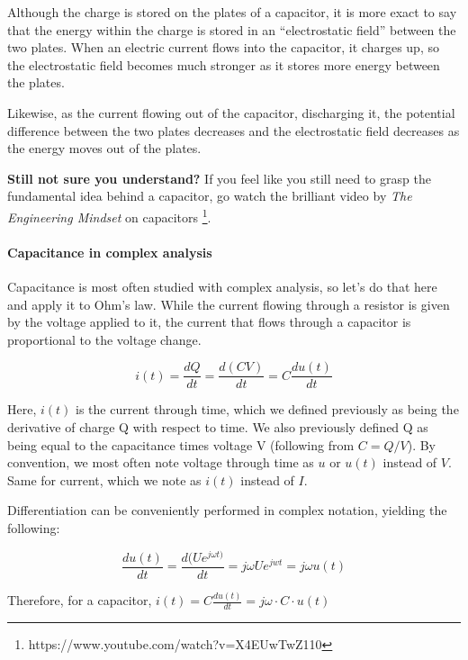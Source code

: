 Although the charge is stored on the plates of a capacitor, it is more exact to say that the energy within the charge is stored in an “electrostatic field” between the two plates. When an electric current flows into the capacitor, it charges up, so the electrostatic field becomes much stronger as it stores more energy between the plates.

Likewise, as the current flowing out of the capacitor, discharging it, the potential difference between the two plates decreases and the electrostatic field decreases as the energy moves out of the plates.

\textbf{Still not sure you understand?} If you feel like you still need to grasp the fundamental idea behind a capacitor, go watch the brilliant video by \textit{The Engineering Mindset} on capacitors \footnote{https://www.youtube.com/watch?v=X4EUwTwZ110}.

\paragraph{Capacitance in complex analysis}
Capacitance is most often studied with complex analysis, so let's do that here and apply it to Ohm's law. While the current flowing through a resistor is given by the voltage applied to it, the current that flows through a capacitor is proportional to the voltage change. 

\begin{equation}
    i(t) = \frac{dQ}{dt} = \frac{d(C V)}{dt} = C\frac{du(t)}{dt}
\end{equation}

Here, $i(t)$ is the current through time, which we defined previously as being the derivative of charge Q with respect to time. We also previously defined Q as being equal to the capacitance times voltage V (following from $C = Q/V$). By convention, we most often note voltage through time as $u$ or $u(t)$ instead of $V$. Same for current, which we note as $i(t)$ instead of $I$.

Differentiation can be conveniently performed in complex notation, yielding the following: 

\begin{equation}
    \frac{du(t)}{dt} = \frac{d (Ue^{j\omega t)}}{dt} = j\omega U e^{jwt} = j\omega u(t) 
\end{equation}

Therefore, for a capacitor, $i(t) = C\frac{du(t)}{dt} = j\omega \cdot C \cdot u(t)$



